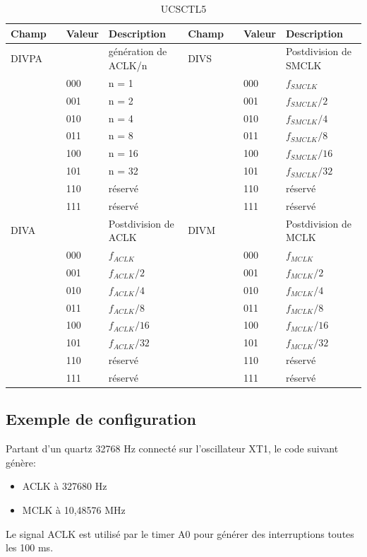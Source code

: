 \begin{table}[H]
\centering 
\begin{tabular}{l l l l || l l l l}
\hline\hline
Champ & & Valeur & Description & Champ & & Valeur & Description \\ %
\hline
DIVPA & & & génération de ACLK/n  & DIVS & & & Postdivision de SMCLK  \\
& & 000 & n = 1  & & & 000 & $f_{SMCLK}$ \\
& & 001 & n = 2  & & & 001 & $f_{SMCLK}/2$ \\
& & 010 & n = 4  & & & 010 & $f_{SMCLK}/4$ \\
& & 011 & n = 8  & & & 011 & $f_{SMCLK}/8$ \\
& & 100 & n = 16  & & & 100 & $f_{SMCLK}/16$ \\
& & 101 & n = 32  & & & 101 & $f_{SMCLK}/32$ \\
& & 110 & réservé  & & & 110 & réservé \\
& & 111 & réservé  & & & 111 & réservé \\
\hline
DIVA & & & Postdivision de ACLK  & DIVM & & & Postdivision de MCLK  \\
& & 000 & $f_{ACLK}$  & & & 000 & $f_{MCLK}$ \\
& & 001 & $f_{ACLK}/2$  & & & 001 & $f_{MCLK}/2$ \\
& & 010 & $f_{ACLK}/4$  & & & 010 & $f_{MCLK}/4$ \\
& & 011 & $f_{ACLK}/8$  & & & 011 & $f_{MCLK}/8$ \\
& & 100 & $f_{ACLK}/16$  & & & 100 & $f_{MCLK}/16$ \\
& & 101 & $f_{ACLK}/32$  & & & 101 & $f_{MCLK}/32$ \\
& & 110 & réservé  & & & 110 & réservé \\
& & 111 & réservé  & & & 111 & réservé \\
\hline
\end{tabular}
\caption{UCSCTL5}
\label{table:UCSCTL5}
\end{table}

\pagebreak
\subsection{Exemple de configuration}
Partant d'un quartz 32768 Hz connecté sur l'oscillateur XT1, le code suivant génère:
\begin{itemize}[label=\textbullet,font=\small]
\item ACLK à 327680 Hz
\item MCLK à 10,48576 MHz
\end{itemize}
Le signal ACLK est utilisé par le timer A0 pour générer des interruptions toutes les 100 ms.

